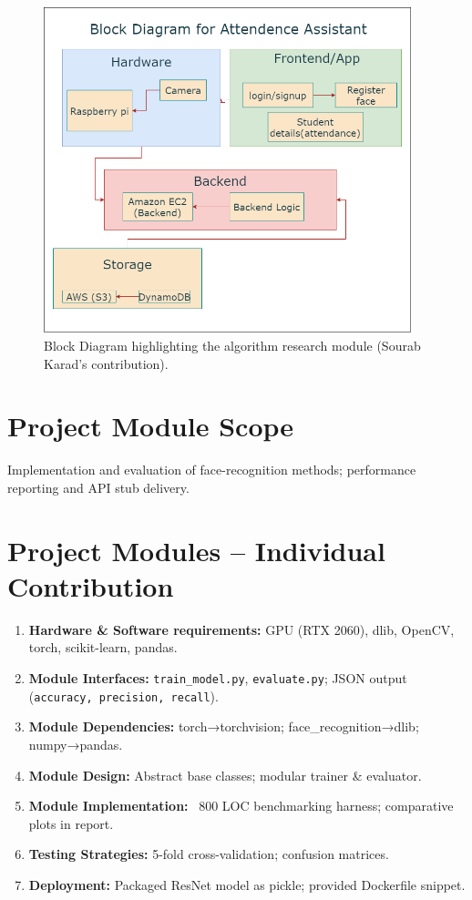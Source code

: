 \documentclass[openany]{report}
\begin{document}
\begin{figure}[H]
    \centering
    \includegraphics[width=0.95\textwidth]{../imgs/block diagram.png}
    \caption{Block Diagram highlighting the algorithm research module (Sourab Karad’s contribution).}
    \label{fig:block_diagram_sourab}
\end{figure}

\section{Project Module Scope}
Implementation and evaluation of face-recognition methods; performance reporting and API stub delivery.

\section{Project Modules – Individual Contribution}
\begin{enumerate}
  \item \textbf{Hardware \& Software requirements:} GPU (RTX 2060), dlib, OpenCV, torch, scikit-learn, pandas.
  \item \textbf{Module Interfaces:} \texttt{train\_model.py}, \texttt{evaluate.py}; JSON output (\texttt{accuracy, precision, recall}).
  \item \textbf{Module Dependencies:} torch→torchvision; face\_recognition→dlib; numpy→pandas.
  \item \textbf{Module Design:} Abstract base classes; modular trainer \& evaluator.
  \item \textbf{Module Implementation:} ~800 LOC benchmarking harness; comparative plots in report.
  \item \textbf{Testing Strategies:} 5-fold cross-validation; confusion matrices.
  \item \textbf{Deployment:} Packaged ResNet model as pickle; provided Dockerfile snippet.
\end{enumerate}
\end{document}
